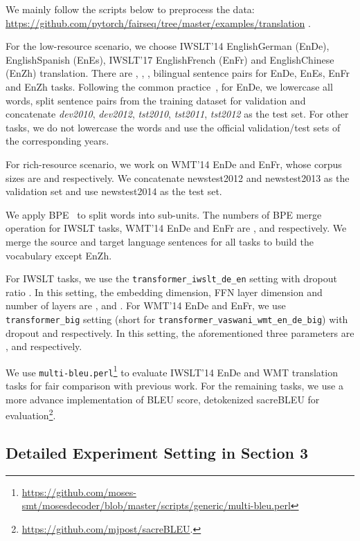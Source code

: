 \documentclass{article} \usepackage{iclr2020_conference,times}
\begin{document}
We mainly follow the scripts below to preprocess the data:
{{\small
\url{https://github.com/pytorch/fairseq/tree/master/examples/translation} 
}}.


 For the low-resource scenario, we choose IWSLT'14 EnglishGerman (EnDe), EnglishSpanish (EnEs), IWSLT'17 EnglishFrench (EnFr) and EnglishChinese (EnZh) translation. There are , , ,  bilingual sentence pairs for EnDe, EnEs, EnFr and EnZh tasks. Following the common practice~\citep{edunov2018classical}, for EnDe, we lowercase all words, split  sentence pairs from the training dataset for validation and concatenate \textit{dev2010}, \textit{dev2012}, \textit{tst2010}, \textit{tst2011}, \textit{tst2012} as the test set. For other tasks, we do not lowercase the words and use the official validation/test sets of the corresponding years. 

For rich-resource scenario, we work on WMT'14 EnDe and EnFr, whose corpus sizes are  and  respectively. We concatenate newstest2012 and newstest2013 as the validation set and use newstest2014 as the test set. 

We apply BPE~\citep{sennrich2016neural} to split words into sub-units. The numbers of BPE merge operation for IWSLT tasks, WMT'14 EnDe and EnFr are ,  and  respectively. We merge the source and target language sentences for all tasks to build the vocabulary except EnZh. 

 For IWSLT tasks, we use the \texttt{transformer\_iwslt\_de\_en} setting with dropout ratio . In this setting, the embedding dimension, FFN layer dimension and number of layers are ,  and . For WMT'14 EnDe and EnFr, we use \texttt{transformer\_big} setting (short for \texttt{transformer\_vaswani\_wmt\_en\_de\_big}) with dropout  and  respectively. In this setting, the aforementioned three parameters are ,  and  respectively. 

We use \texttt{multi-bleu.perl}\footnote{\url{https://github.com/moses-smt/mosesdecoder/blob/master/scripts/generic/multi-bleu.perl}} to evaluate IWSLT'14 EnDe and WMT translation tasks for fair comparison with previous work. For the remaining tasks, we use a more advance implementation of BLEU score, detokenized sacreBLEU for evaluation\footnote{\url{https://github.com/mjpost/sacreBLEU}.}. 




\subsection{Detailed Experiment Setting in Section 3}\label{preliminary}
\end{document}
